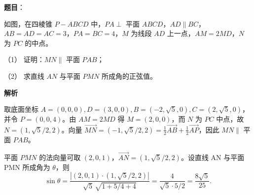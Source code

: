 \begin{answer}

\textbf{题目}：

如图，在四棱锥 \(P-ABCD\) 中，\(PA\perp\) 平面 \(ABCD\)，\(AD\parallel BC\)，\(AB=AD=AC=3\)，\(PA=BC=4\)，\(M\) 为线段 \(AD\) 上一点，\(AM=2MD\)，\(N\) 为 \(PC\) 的中点。

（1） 证明：\(MN\parallel\) 平面 \(PAB\)；

（2） 求直线 \(AN\) 与平面 \(PMN\) 所成角的正弦值。
\nopagebreak[4]
\begin{center}\end{center}
\nopagebreak[4]
\textbf{解析}


取底面坐标 \(A=(0,0,0),D=(3,0,0),B=(-2,\sqrt5,0),C=(2,\sqrt5,0)\)，并令 \(P=(0,0,4)\)。由 \(AM=2MD\) 得 \(M=(2,0,0)\)，而 \(N\) 为 \(PC\) 中点，故 \(N=(1,\sqrt5/2,2)\)。向量 \(\overrightarrow{MN}=(-1,\sqrt5/2,2)=\frac12\overrightarrow{AB}+\frac12\overrightarrow{AP}\)，因此 \(MN\parallel\) 平面 \(PAB\)。


平面 \(PMN\) 的法向量可取 \((2,0,1)\)，\(\overrightarrow{AN}=(1,\sqrt5/2,2)\)。设直线 AN 与平面 PMN 所成角为 \(\theta\)，则
\nopagebreak[4]
\[
\sin\theta=\frac{|(2,0,1)\cdot(1,\sqrt5/2,2)|}{\sqrt5\,\sqrt{1+5/4+4}}
=\frac{4}{\sqrt5\cdot5/2}=\frac{8\sqrt5}{25}.
\]



\end{answer}
